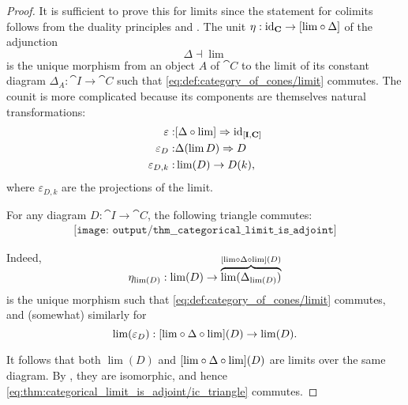 \begin{proof}
  It is sufficient to prove this for limits since the statement for colimits follows from the duality principles  and . The unit \( \eta: \id_{\cat{C}} \to [{\lim} \bincirc \Delta] \) of the adjunction
  \begin{equation*}
    \Delta \dashv \lim
  \end{equation*}
  is the unique morphism from an object \( A \) of \( \cat{C} \) to the limit of its constant diagram \( \Delta_A: \cat{I} \to \cat{C} \) such that \eqref{eq:def:category_of_cones/limit} commutes. The counit is more complicated because its components are themselves natural transformations:
  \begin{equation*}
    \begin{aligned}
      \varepsilon:       &[\Delta \bincirc \lim] \Rightarrow \id_{[\cat{I}, \cat{C}]} \\
      \varepsilon_D:     &\Delta(\lim D) \Rightarrow D \\
      \varepsilon_{D,k}: &\lim(D) \to D(k),
    \end{aligned}
  \end{equation*}
  where \( \varepsilon_{D,k} \) are the projections of the limit.

  For any diagram \( D: \cat{I} \to \cat{C} \), the following triangle commutes:
  \begin{equation}\label{eq:thm:categorical_limit_is_adjoint/ic_triangle}
    \begin{aligned}
      \texttt{[image: output/thm\_\_categorical\_limit\_is\_adjoint]}
    \end{aligned}
  \end{equation}

  Indeed,
  \begin{equation*}
    \eta_{\lim(D)}: \lim(D) \to \smash{ \overbrace{\lim(\Delta_{\lim(D)})}^{[{\lim} \bincirc \Delta \bincirc {\lim}](D)} }
  \end{equation*}
  is the unique morphism such that \eqref{eq:def:category_of_cones/limit} commutes, and (somewhat) similarly for
  \begin{equation*}
    \lim(\varepsilon_D): [{\lim} \bincirc \Delta \bincirc {\lim}](D) \to \lim(D).
  \end{equation*}

  It follows that both \( \lim(D) \) and \( [{\lim} \bincirc \Delta \bincirc {\lim}](D) \) are limits over the same diagram. By , they are isomorphic, and hence \eqref{eq:thm:categorical_limit_is_adjoint/ic_triangle} commutes.


\end{proof}
